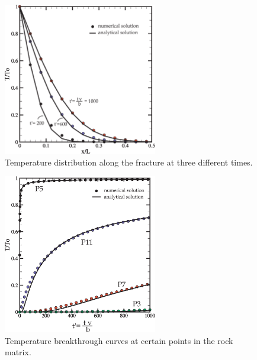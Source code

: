 \begin{figure}[H]
\centering
\includegraphics[width=0.6\textwidth]{T/figures/lauwerier-fracture.eps}
\caption{Temperature distribution along the fracture at three different times.}
\label{fig-lauwerier-fracture}
\end{figure}
\begin{figure}[H]
\centering
\includegraphics[width=0.6\textwidth]{T/figures/lauwerier-points.eps}
\caption{Temperature breakthrough curves at certain points in the rock matrix.}
\label{fig-lauwerier-points}
\end{figure}
